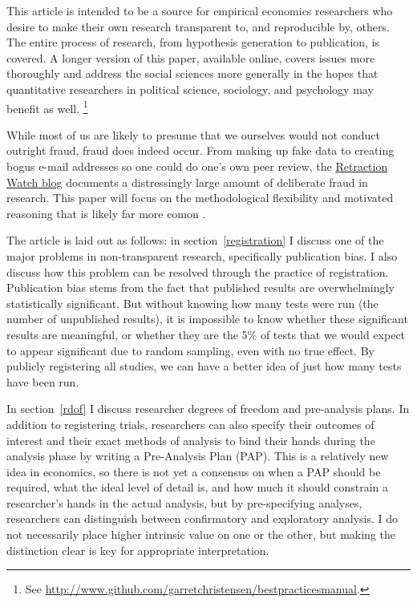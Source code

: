 \documentclass[12pt] {article}
\begin{document}
This article is intended to be a source for empirical economics researchers who desire to make their own research transparent to, and reproducible by, others. The entire process of research, from
hypothesis generation to publication, is covered. A longer version of this paper, available online, covers issues more thoroughly and address the social sciences more generally in the hopes that quantitative researchers in political science, sociology, and psychology may benefit as well. \footnote{See \url{http://www.github.com/garretchristensen/bestpracticesmanual}.}

While most of us are likely to presume that we ourselves would not
conduct outright fraud, fraud does indeed occur. From making up fake
data to creating bogus e-mail addresses so one could do one's own peer
review, the \href{http://www.retractionwatch.com}{Retraction Watch blog}
documents a distressingly large amount of deliberate fraud in research. This paper will focus on the methodological flexibility and motivated reasoning that is likely far more comon \cite{nosek_scientific_2012}.

The article is laid out as follows: in section~\ref{registration} I discuss one of the major problems in non-transparent research, specifically publication bias. I also discuss how this
problem can be resolved through the practice of registration.
Publication bias stems from the fact that published results are
overwhelmingly statistically significant. But without knowing how many
tests were run (the number of unpublished results), it is impossible to know whether these significant
results are meaningful, or whether they are the 5\% of tests that we
would expect to appear significant due to random sampling, even with no
true effect. By publicly registering all studies, we can have a better
idea of just how many tests have been run.

In section~\ref{rdof} I discuss researcher degrees of freedom and pre-analysis
plans. In addition to registering trials, researchers can also
specify their outcomes of interest and their exact methods of analysis
to bind their hands during the analysis phase by writing a Pre-Analysis
Plan (PAP). This is a relatively new idea in economics, so
there is not yet a consensus on when a PAP should be required, what the
ideal level of detail is, and how much it should constrain a
researcher's hands in the actual analysis, but by pre-specifying analyses,
researchers can distinguish between confirmatory and exploratory
analysis. I do not necessarily place higher intrinsic value on one or
the other, but making the distinction clear is key for appropriate
interpretation.
\end{document}
